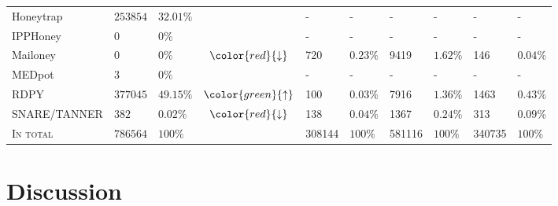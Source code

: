 \begin{table}
\begin{tabularx}{\linewidth}{l|XXc|XX|XX|XX}
        Honeytrap          & $253854$                               & $32.01\%$                               &                                  & -                                  & -             & -               & -             & -               & -             \\
        IPPHoney           & $0$                                    & $0\%$                                   &                                  & -                                  & -             & -               & -             & -               & -             \\
        Mailoney           & $0$                                    & $0\%$                                   & $\color{red}{\downarrow}$                                 & 720                                & $0.23\%$      & 9419            & $1.62\%$      & 146             & $0.04\%$      \\
        MEDpot             & $3$                                    & $0\%$                                   &                                  & -                                  & -             & -               & -             & -               & -             \\
        RDPY               & $377045$                               & $49.15\%$                               &  $\color{green}{\uparrow}$                                & 100                                & $0.03\%$      & 7916            & $1.36\%$      & 1463            & $0.43\%$      \\
        SNARE/TANNER       & $382$                                  & $0.02\%$                                & $\color{red}{\downarrow}$                                 & 138                                & $0.04\%$      & 1367            & $0.24\%$      & 313             & $0.09\%$      \\
        \hline
        \textsc{In total}  & $786564$                               & $100\%$                                 &                                  & 308144                             & $100\%$       & 581116          & $100\%$       & 340735          & $100\%$       \\
        \bottomrule
    \end{tabularx}
    \label{tab:overview-honeypots-attacks}
\end{table}

\section{Discussion}

